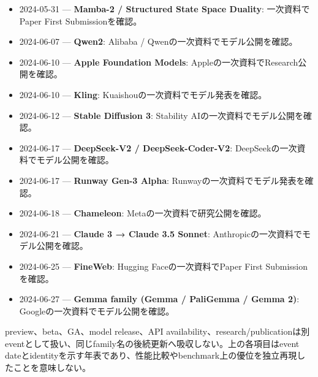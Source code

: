 \begin{itemize}[leftmargin=1.5em,itemsep=0.45em]
\item 2024-05-31 — \textbf{Mamba-2 / Structured State Space Duality}: 一次資料でPaper First Submissionを確認。 \autocite{src-0cba3ed32188}
\item 2024-06-07 — \textbf{Qwen2}: Alibaba / Qwenの一次資料でモデル公開を確認。 \autocite{src-461ae12066d1}
\item 2024-06-10 — \textbf{Apple Foundation Models}: Appleの一次資料でResearch公開を確認。 \autocite{src-c89d38f0e830}
\item 2024-06-10 — \textbf{Kling}: Kuaishouの一次資料でモデル発表を確認。 \autocite{src-9c32b95d27a7}
\item 2024-06-12 — \textbf{Stable Diffusion 3}: Stability AIの一次資料でモデル公開を確認。 \autocite{src-7b3484ead314}
\item 2024-06-17 — \textbf{DeepSeek-V2 / DeepSeek-Coder-V2}: DeepSeekの一次資料でモデル公開を確認。 \autocite{src-d9d69089eb6a}
\item 2024-06-17 — \textbf{Runway Gen-3 Alpha}: Runwayの一次資料でモデル発表を確認。 \autocite{src-b881d1321d94}
\item 2024-06-18 — \textbf{Chameleon}: Metaの一次資料で研究公開を確認。 \autocite{src-e1259b3c0804}
\item 2024-06-21 — \textbf{Claude 3 → Claude 3.5 Sonnet}: Anthropicの一次資料でモデル公開を確認。 \autocite{src-e91e6f80eaac}
\item 2024-06-25 — \textbf{FineWeb}: Hugging Faceの一次資料でPaper First Submissionを確認。 \autocite{src-51631a225b70}
\item 2024-06-27 — \textbf{Gemma family (Gemma / PaliGemma / Gemma 2)}: Googleの一次資料でモデル公開を確認。 \autocite{src-0395647db4a8}
\end{itemize}

preview、beta、GA、model release、API availability、research/publicationは別eventとして扱い、同じfamily名の後続更新へ吸収しない。上の各項目はevent dateとidentityを示す年表であり、性能比較やbenchmark上の優位を独立再現したことを意味しない。
